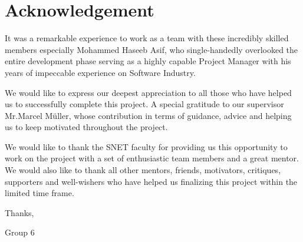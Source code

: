 \chapter*{Acknowledgement}
\label{cha:acknowledgments}
\vspace{20 mm}

 It was a remarkable experience to work as a team with these incredibly skilled members especially Mohammed Haseeb Asif, who single-handedly overlooked the entire development phase serving as a highly capable Project Manager with his years of impeccable experience on Software Industry.

We would like to express our deepest appreciation to all those who have helped us to successfully complete this project. A special gratitude to our supervisor Mr.Marcel Müller, whose contribution in terms of guidance, advice and helping us to keep motivated throughout the project. 


We would like to thank the SNET faculty for providing us this opportunity to work on the project with a set of enthusiastic team members and a great mentor. We would also like to thank all other mentors, friends, motivators, critiques, supporters and well-wishers who have helped us finalizing this project within the limited time frame. 

\vspace{20 mm}
\noindent Thanks, 
\vspace{2 mm}

\noindent Group 6


